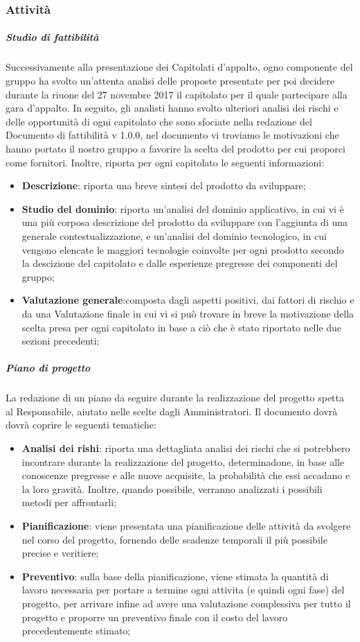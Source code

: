 \subsubsection{Attività}
\subparagraph{Studio di fattibilità}
Successivamente alla presentazione dei Capitolati d'appalto, ogno componente del gruppo ha svolto un'attenta analisi delle proposte presentate per poi decidere durante la riuone del 27 novembre 2017 il capitolato per il quale partecipare alla gara d'appalto. In seguito, gli analisti hanno svolto ulteriori analisi dei rischi e delle opportunità di ogni capitolato che sono sfociate nella redazione del Documento di fattibilità v 1.0.0, nel documento vi troviamo le motivazioni che hanno portato il nostro gruppo a favorire la scelta del prodotto per cui proporci come fornitori. Inoltre, riporta per ogni capitolato le seguenti informazioni:
\begin{itemize}
 	\item\textbf{{Descrizione}}: riporta una breve sintesi del prodotto da sviluppare;
 	\item\textbf{{Studio del dominio}}: riporta un'analisi del dominio applicativo, in cui vi è una più corposa descrizione del prodotto da sviluppare con l'aggiunta di una generale contestualizzazione, e un'analisi del dominio tecnologico, in cui vengono elencate le maggiori tecnologie coinvolte per ogni prodotto secondo la descizione del capitolato e dalle esperienze pregresse dei componenti del gruppo;
	\item\textbf{{Valutazione generale}}:composta dagli aspetti positivi, dai fattori di rischio e da una Valutazione finale in cui vi si può trovare in breve la motivazione della scelta presa per ogni capitolato in base a ciò che è stato riportato nelle due sezioni precedenti; 		
\end{itemize}
\subparagraph{Piano di progetto}
La redazione di un piano da seguire durante la realizzazione del progetto spetta al Responsabile, aiutato nelle scelte dagli Amministratori. Il documento dovrà dovrà coprire le seguenti tematiche:
 \begin{itemize}
 	\item\textbf{{Analisi dei rishi}}: riporta una dettagliata analisi dei rischi che si potrebbero incontrare durante la realizzazione del progetto, determinadone, in base alle conoscenze pregresse e alle nuove acquisite, la probabilità che essi accadano e la loro gravità. Inoltre, quando possibile, verranno analizzati i possibili metodi per affrontarli;
 	\item\textbf{{Pianificazione}}: viene presentata una pianificazione delle attività da svolgere nel corso del progetto, fornendo delle scadenze temporali il più possibile precise e veritiere;
 	\item\textbf{{Preventivo}}: sulla base della pianificazione, viene stimata la quantità di lavoro necessaria per portare a termine ogni attivita (e quindi ogni fase) del progetto, per arrivare infine ad avere una valutazione complessiva per tutto il progetto e proporre un preventivo finale con il costo del lavoro precedentemente stimato; 		
 \end{itemize}
